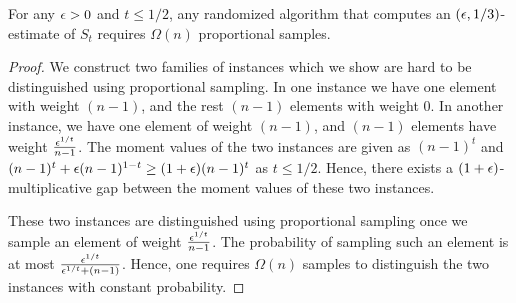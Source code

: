 \begin{thm} For any $\epsilon>0$ and $t\leq 1/2$, any randomized algorithm that computes an $(\epsilon,1/3)$-estimate of $S_t$ requires $\Omega(n)$ proportional samples. \end{thm}
\begin{proof} We construct two families of instances which we show are hard to be distinguished using proportional sampling. In one instance we have one element with weight $(n-1)$, and the rest $(n-1)$ elements with weight $0$. In another instance, we have one element of weight $(n-1)$, and $(n-1)$ elements have weight $\frac{\epsilon^{1/t}}{n-1}$. The moment values of the two instances are given as $(n-1)^t$ and $(n-1)^t + \epsilon (n-1)^{1-t}\geq (1+\epsilon) (n-1)^t$ as $t\leq 1/2$. Hence, there exists a $(1+\epsilon)$-multiplicative gap between the moment values of these two instances.

These two instances are distinguished using proportional sampling once we sample an element of weight $\frac{\epsilon^{1/t}}{n-1}$. The probability of sampling such an element is at most $\frac{\epsilon^{1/t}}{\epsilon^{1/t} + (n-1)}$. Hence, one requires $\Omega(n)$ samples to distinguish the two instances with constant probability. \end{proof}

